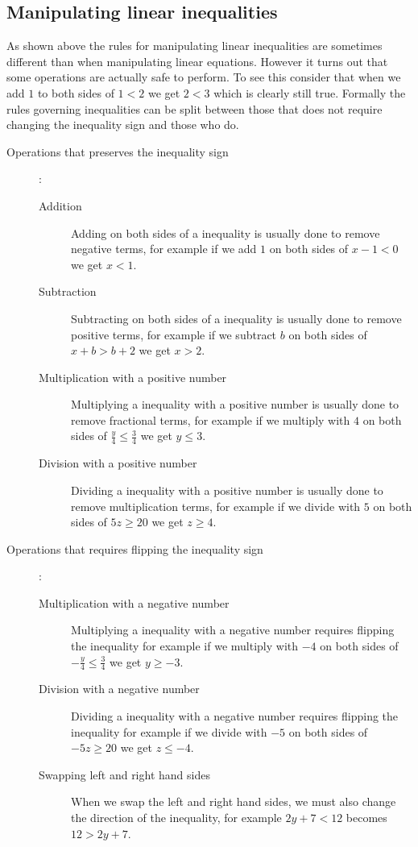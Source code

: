 \subsection{Manipulating linear inequalities}
As shown above the rules for manipulating linear inequalities are
sometimes different than when manipulating linear equations. However it
turns out that some operations are actually safe to perform. To see this
consider that when we add $1$ to both sides of $1 < 2$ we get $2 < 3$
which is clearly still true. Formally the rules governing inequalities
can be split between those that does not require changing the inequality
sign and those who do.
\begin{description}
\item [Operations that preserves the inequality sign]:
\begin{description}
\item [Addition] Adding on both sides of a inequality is usually done to
remove negative terms, for example if we add $1$ on both sides of
$x - 1 < 0$ we get $x < 1$.
\item [Subtraction] Subtracting on both sides of a inequality is usually
done to remove positive terms, for example if we subtract $b$ on both
sides of $x + b > b + 2$ we get $x > 2$.
\item [Multiplication with a positive number] Multiplying a inequality
with a positive number is usually done to remove fractional terms, for
example if we multiply with $4$ on both sides of
$\frac{y}{4} \leq \frac{3}{4}$ we get $y \leq 3$.
\item [Division with a positive number]
Dividing a inequality with a positive number is usually done to remove
multiplication terms, for example if we divide with $5$ on both sides of
$5z \geq 20$ we get $z \geq 4$.
\end{description}
\item [Operations that requires flipping the inequality sign]:
\begin{description}
\item [Multiplication with a negative number] Multiplying a inequality
with a negative number requires flipping the inequality for example if we
multiply with $-4$ on both sides of $-\frac{y}{4} \leq \frac{3}{4}$ we
get $y \geq -3$.
\item [Division with a negative number]
Dividing a inequality with a negative number requires flipping the
inequality for example if we divide with $-5$ on both sides of
$-5z \geq 20$ we get $z \leq -4$.
\item [Swapping left and right hand sides] When we swap the left and
right hand sides, we must also change the direction of the inequality,
for example $2y+7 < 12$ becomes $12 > 2y+7$.
\end{description}
\end{description}
